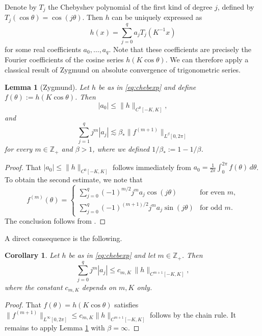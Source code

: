 \documentclass[10pt,reqno]{amsart}
\newtheorem{lem}[thm]{Lemma}
\newtheorem{cor}[thm]{Corollary}
\theoremstyle{definition}
\theoremstyle{remark}
\numberwithin{equation}{section}
\numberwithin{figure}{section}
\numberwithin{table}{section}
\begin{document}
Denote by $T_j$ the Chebyshev polynomial of the first kind of degree $j$, 
defined by $T_j(\cos\theta) = \cos(j\theta)$. Then $h$ can be 
uniquely expressed as
\begin{equation}
\label{eq:chebexp}
        h(x) = \sum_{j=0}^q a_j T_j(K^{-1}x)
\end{equation}
for some real coefficients $a_0,\ldots,a_q$. Note that these coefficients 
are precisely the Fourier coefficients of the cosine series 
$h(K\cos\theta)$. We can therefore apply a classical result of
Zygmund on absolute convergence of trigonometric series.

\begin{lem}[Zygmund]
\label{lem:absconv}
Let $h$ be as in \eqref{eq:chebexp} and define $f(\theta) := h(K\cos\theta)$.
Then
$$
	|a_0|\le \|h\|_{C^0[-K,K]},
$$
and
$$
        \sum_{j=1}^q j^m |a_j| 
        \lesssim
	\beta_*
	\|f^{(m+1)}\|_{L^\beta[0,2\pi]}
$$
for every $m\in\mathbb{Z}_+$ and $\beta>1$, where we defined 
$1/\beta_*:=1-1/\beta$.
\end{lem}

\begin{proof}
That $|a_0|\le \|h\|_{C^0[-K,K]}$ follows immediately from
$a_0 = \frac{1}{2\pi}\int_0^{2\pi} f(\theta)\,d\theta$.
To obtain the second estimate, we note that 
$$
        f^{(m)}(\theta) = 
        \begin{cases}
        \sum_{j=0}^q (-1)^{m/2} j^m a_j \cos(j\theta)
        & \text{for even }m,\\
        \sum_{j=0}^q (-1)^{(m+1)/2} j^m a_j \sin(j\theta)
        & \text{for odd }m.
        \end{cases}
$$
The conclusion follows from \cite[p.\ 242]{Zyg02}.
\end{proof}

A direct consequence is the following.

\begin{cor}
\label{cor:abscp}
Let $h$ be as in \eqref{eq:chebexp} and let $m\in\mathbb{Z}_+$. Then
$$
        \sum_{j=0}^q j^m |a_j| 
        \le c_{m,K}\, \|h\|_{C^{m+1}[-K,K]},
$$
where the constant $c_{m,K}$ depends on $m,K$ only.
\end{cor}

\begin{proof}
That $f(\theta)=h(K\cos\theta)$ satisfies
$\|f^{(m+1)}\|_{L^\infty[0,2\pi]} \le c_{m,K} \|h\|_{C^{m+1}[-K,K]}$
follows by the chain rule. It remains to apply
Lemma \ref{lem:absconv} with $\beta=\infty$.
\end{proof}
\end{document}
